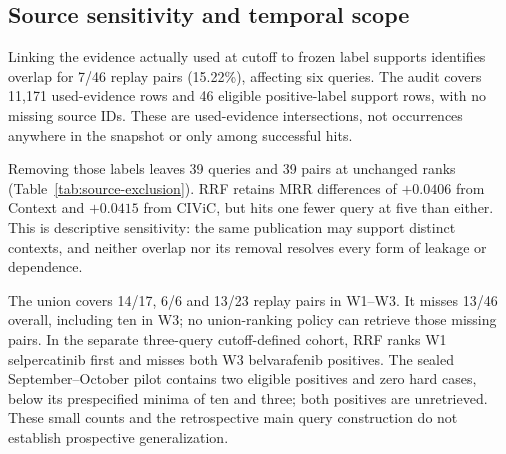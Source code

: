 \subsection{Source sensitivity and temporal scope}

Linking the evidence actually used at cutoff to frozen label supports identifies overlap for 7/46 replay pairs (15.22\%), affecting six queries. The audit covers 11,171 used-evidence rows and 46 eligible positive-label support rows, with no missing source IDs. These are used-evidence intersections, not occurrences anywhere in the snapshot or only among successful hits.

Removing those labels leaves 39 queries and 39 pairs at unchanged ranks (Table~\ref{tab:source-exclusion}). RRF retains MRR differences of $+0.0406$ from Context and $+0.0415$ from CIViC, but hits one fewer query at five than either. This is descriptive sensitivity: the same publication may support distinct contexts, and neither overlap nor its removal resolves every form of leakage or dependence.

The union covers 14/17, 6/6 and 13/23 replay pairs in W1--W3. It misses 13/46 overall, including ten in W3; no union-ranking policy can retrieve those missing pairs. In the separate three-query cutoff-defined cohort, RRF ranks W1 selpercatinib first and misses both W3 belvarafenib positives. The sealed September--October pilot contains two eligible positives and zero hard cases, below its prespecified minima of ten and three; both positives are unretrieved. These small counts and the retrospective main query construction do not establish prospective generalization.

